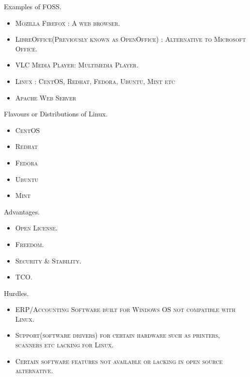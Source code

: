 \documentclass{beamer}
\begin{document}
\begin{frame}{}
\begin{center}
Examples of FOSS.
\begin{itemize}\itemsep1pt \parskip0pt 
\item \textsc{\small Mozilla Firefox : A web browser.}
\item \textsc{\small LibreOffice(Previously known as OpenOffice) : Alternative to Microsoft Office.}
\item \textsc{\small VLC Media Player: Multimedia Player.}
\item \textsc{\small Linux : CentOS, Redhat, Fedora, Ubuntu, Mint etc}
\item \textsc{\small Apache Web Server}
\end{itemize}
\end{center}
\end{frame}

\begin{frame}{}
\begin{center}
Flavours or Distributions of Linux.
\begin{itemize}\itemsep1pt \parskip0pt 
\item \textsc{\small CentOS}
\item \textsc{\small Redhat}
\item \textsc{\small Fedora}
\item \textsc{\small Ubuntu}
\item \textsc{\small Mint}
\end{itemize}
\end{center}
\end{frame}


\begin{frame}{}
\begin{center}
Advantages.
\begin{itemize}\itemsep1pt \parskip0pt 
\item \textsc{\small Open License.}
\item \textsc{\small Freedom.}
\item \textsc{\small Security \& Stability.}
\item \textsc{\small TCO.}
\end{itemize}
\end{center}
\end{frame}

\begin{frame}{}
\begin{center}
Hurdles.
\begin{itemize}\itemsep1pt \parskip0pt 
\item \textsc{\small ERP/Accounting Software built for Windows OS not compatible with Linux.}
\item \textsc{\small Support(software drivers) for certain hardware such as printers, scanners etc lacking for Linux.}
\item \textsc{\small Certain software features not available or lacking in open source alternative.}
\end{itemize}
\end{center}
\end{frame}
\end{document}
